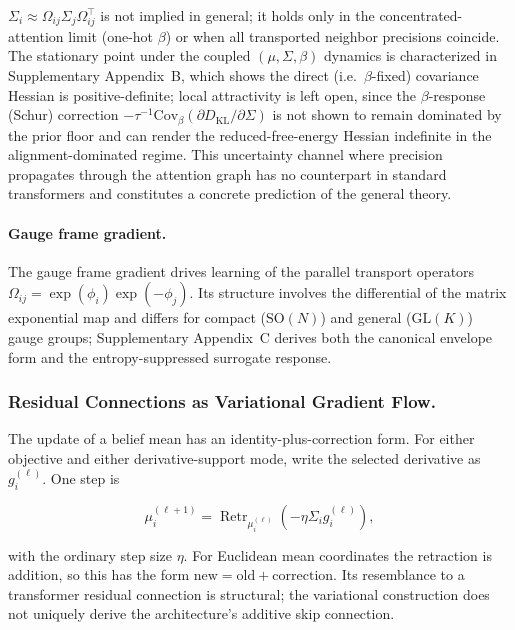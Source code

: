 \documentclass[twoside,11pt]{article}
\begin{document}
$\Sigma_i \approx \Omega_{ij}\Sigma_j\Omega_{ij}^\top$ is not implied in
general; it holds only in the concentrated-attention limit (one-hot
$\beta$) or when all transported neighbor precisions coincide. The stationary point under the coupled
$(\mu,\Sigma,\beta)$ dynamics is characterized in Supplementary
Appendix~B, which shows the direct (i.e.\ $\beta$-fixed) covariance
Hessian is positive-definite; local attractivity is left open, since the
$\beta$-response (Schur) correction $-\tau^{-1}\mathrm{Cov}_\beta(\partial
D_{\mathrm{KL}}/\partial\Sigma)$ is not shown to remain dominated by the
prior floor and can render the reduced-free-energy Hessian indefinite in
the alignment-dominated regime.
This uncertainty channel where precision propagates through the attention
graph has no counterpart in standard transformers and constitutes a
concrete prediction of the general theory.

\paragraph{Gauge frame gradient.}
The gauge frame gradient drives learning of the parallel transport operators $\Omega_{ij}=\exp(\phi_i)\exp(-\phi_j)$. Its structure involves the differential of the matrix exponential map and differs for compact ($\mathrm{SO}(N)$) and general ($\mathrm{GL}(K)$) gauge groups; Supplementary Appendix~C derives both the canonical envelope form and the entropy-suppressed surrogate response.

\subsubsection{Residual Connections as Variational Gradient Flow.}
\label{sec:residual_connections}

The update of a belief mean has an identity-plus-correction form. For either objective and either derivative-support mode, write the selected derivative as $g_i^{(\ell)}$. One step is

\begin{equation}
\mu_i^{(\ell+1)}
=\operatorname{Retr}_{\mu_i^{(\ell)}}
\left(-\eta\Sigma_i g_i^{(\ell)}\right),
\label{eq:residual_gradient_flow}
\end{equation}

with the ordinary step size $\eta$. For Euclidean mean coordinates the retraction is addition, so this has the form $\text{new}=\text{old}+\text{correction}$. Its resemblance to a transformer residual connection is structural; the variational construction does not uniquely derive the architecture's additive skip connection.
\end{document}
